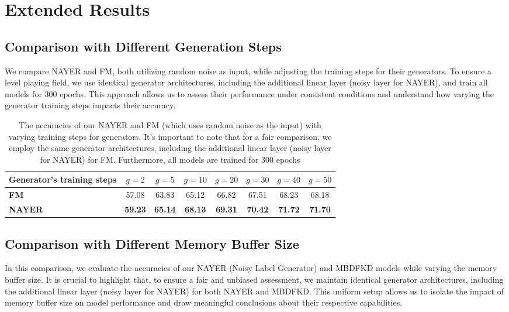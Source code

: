 \documentclass{article} %
\begin{document}
\section{Extended Results}
\subsection{Comparison with Different Generation Steps}

We compare NAYER and FM, both utilizing random noise as input, while adjusting the training steps for their generators. To ensure a level playing field, we use identical generator architectures, including the additional linear layer (noisy layer for NAYER), and train all models for 300 epochs. This approach allows us to assess their performance under consistent conditions and understand how varying the generator training steps impacts their accuracy.

\begin{table}[h]
\centering
\caption{The accuracies of our NAYER and FM (which uses random noise as the input) with varying training steps for generators. It's important to note that for a fair comparison, we employ the same generator architectures, including the additional linear layer (noisy layer for NAYER) for FM. Furthermore, all models are trained for 300 epochs}
\begin{adjustbox}{width=\linewidth}
\begin{tabular}{@{}lccccccc@{}}
\toprule
\textbf{Generator's training steps  }  & $g = 2$ & $g = 5$ & $g = 10$ & $g = 20$ & $g = 30$ & $g = 40$ & $g = 50$ \\ \midrule
\textbf{FM} & 57.08 & 63.83 & 65.12  & 66.82  & 67.51  & 68.23 & 68.18  \\
\textbf{NAYER} & \textbf{59.23} & \textbf{65.14} &\textbf{ 68.13}  & \textbf{69.31}  & \textbf{70.42}  & \textbf{71.72}  & \textbf{71.70}   \\ \bottomrule
\end{tabular}
\end{adjustbox}
\label{tab:as_mulfm}
\end{table}

\subsection{Comparison with Different Memory Buffer Size}
In this comparison, we evaluate the accuracies of our NAYER (Noisy Label Generator) and MBDFKD models while varying the memory buffer size. It is crucial to highlight that, to ensure a fair and unbiased assessment, we maintain identical generator architectures, including the additional linear layer (noisy layer for NAYER) for both NAYER and MBDFKD. This uniform setup allows us to isolate the impact of memory buffer size on model performance and draw meaningful conclusions about their respective capabilities.
\end{document}
